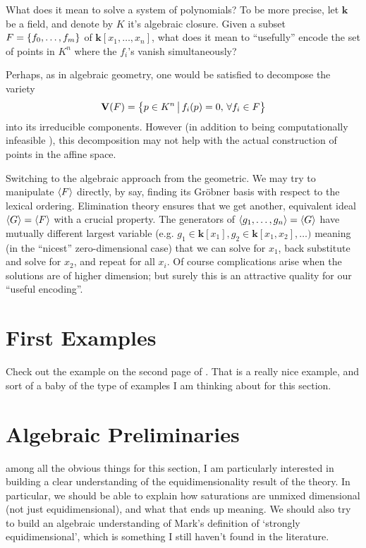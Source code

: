 \documentclass[12pt]{article}
\newcommand{\kk}{\mathbf{k}}
\begin{document}
\begin{question} What does it mean to solve a system of polynomials? To be more precise, let $\kk$ be a field, and denote by $K$ it's algebraic closure.  Given a subset $F=\left\{ f_0, \ldots, f_m \right\}$ of $\kk[x_1,\ldots,x_n]$, what does it mean to ``usefully'' encode the set of points in $K^n$ where the $f_i$'s vanish simultaneously? 
\end{question}

Perhaps, as in algebraic geometry, one would be satisfied to decompose the variety 
$$\mathbf{V}(F) = \left\{  p \in K^n \, \big{|} \, f_i(p)=0, \,\forall f_i \in F \right\}$$
into its irreducible components. However (in addition to being computationally infeasible \cite{}), this decomposition may not help with the actual construction of points in the affine space.

Switching to the algebraic approach from the geometric. We may try to manipulate $\left< F \right>$ directly, by say, finding its Gr\"obner basis with respect to the lexical ordering. Elimination theory ensures that we get another, equivalent ideal $\left< G \right> = \left< F \right>$ with a crucial property. The generators of $\left< g_1, \ldots, g_n \right> = \left< G \right>$ have mutually different largest variable (e.g. $g_1 \in \kk[x_1], g_2 \in \kk[x_1,x_2], \ldots)$ meaning (in the ``nicest'' zero-dimensional case) that we can solve for $x_1$, back substitute and solve for $x_2$, and repeat for all $x_i$. Of course complications arise when the solutions are of higher dimension; but surely this is an attractive quality for our ``useful encoding''.

\section{First Examples}

Check out the example on the second page of \cite{AM99}.  That is a really nice example, and sort of a baby of the type of examples I am thinking about for this section.

\section{Algebraic Preliminaries}

\begin{remark} among all the obvious things for this section, I am particularly interested in building a clear understanding of the equidimensionality result of the theory.  In particular, we should be able to explain how saturations are unmixed dimensional (not just equidimensional), and what that ends up meaning.  We should also try to build an algebraic understanding of Mark's definition of `strongly equidimensional', which is something I still haven't found in the literature.
\end{remark}
\end{document}
